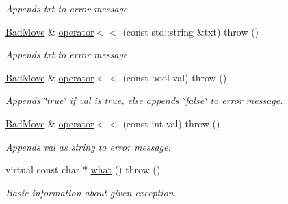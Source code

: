 \begin{DoxyCompactItemize}
\begin{DoxyCompactList}\small\item\em Appends txt to error message. \item\end{DoxyCompactList}\item 
\hypertarget{classChEngn_1_1BadMove_a94429266082389a3505348e4a27e33e3}{
\hyperlink{classChEngn_1_1BadMove}{BadMove} \& \hyperlink{classChEngn_1_1BadMove_a94429266082389a3505348e4a27e33e3}{operator$<$$<$} (const std::string \&txt)  throw ()}
\label{classChEngn_1_1BadMove_a94429266082389a3505348e4a27e33e3}

\begin{DoxyCompactList}\small\item\em Appends txt to error message. \item\end{DoxyCompactList}\item 
\hypertarget{classChEngn_1_1BadMove_a1c08b2baacc694ca64f48dc5d493bfc8}{
\hyperlink{classChEngn_1_1BadMove}{BadMove} \& \hyperlink{classChEngn_1_1BadMove_a1c08b2baacc694ca64f48dc5d493bfc8}{operator$<$$<$} (const bool val)  throw ()}
\label{classChEngn_1_1BadMove_a1c08b2baacc694ca64f48dc5d493bfc8}

\begin{DoxyCompactList}\small\item\em Appends \char`\"{}true\char`\"{} if val is true, else appends \char`\"{}false\char`\"{} to error message. \item\end{DoxyCompactList}\item 
\hypertarget{classChEngn_1_1BadMove_a314454e1ea29439f4db4bd12d8699a3d}{
\hyperlink{classChEngn_1_1BadMove}{BadMove} \& \hyperlink{classChEngn_1_1BadMove_a314454e1ea29439f4db4bd12d8699a3d}{operator$<$$<$} (const int val)  throw ()}
\label{classChEngn_1_1BadMove_a314454e1ea29439f4db4bd12d8699a3d}

\begin{DoxyCompactList}\small\item\em Appends val as string to error message. \item\end{DoxyCompactList}\item 
\hypertarget{classChEngn_1_1BadMove_ae7c3114036a9917a5aef4458a8f567d3}{
virtual const char $\ast$ \hyperlink{classChEngn_1_1BadMove_ae7c3114036a9917a5aef4458a8f567d3}{what} ()  throw ()}
\label{classChEngn_1_1BadMove_ae7c3114036a9917a5aef4458a8f567d3}

\begin{DoxyCompactList}\small\item\em Basic information about given exception. \item\end{DoxyCompactList}\end{DoxyCompactItemize}


